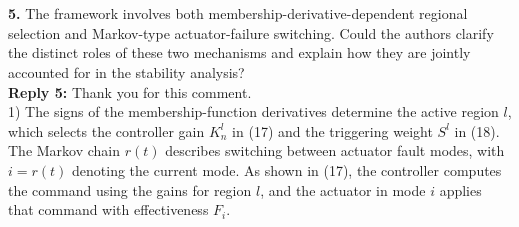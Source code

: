\documentclass[10pt,fleqn]{article}
\begin{document}
%
%
%
%


~\\
\\
\textbf{5.} The framework involves both membership-derivative-dependent regional selection and Markov-type actuator-failure switching. Could the authors clarify the distinct roles of these two mechanisms and explain how they are jointly accounted for in the stability analysis?
\\[10pt]
\indent \textbf{Reply 5:} Thank you for this comment.\\

1) The signs of the membership-function derivatives determine the active region $l$, which selects the controller gain $K_n^l$ in (17) and the triggering weight $S^l$ in (18). The Markov chain $r(t)$ describes switching between actuator fault modes, with $i=r(t)$ denoting the current mode. As shown in (17), the controller computes the command using the gains for region $l$, and the actuator in mode $i$ applies that command with effectiveness $F_i$.\\
\end{document}
